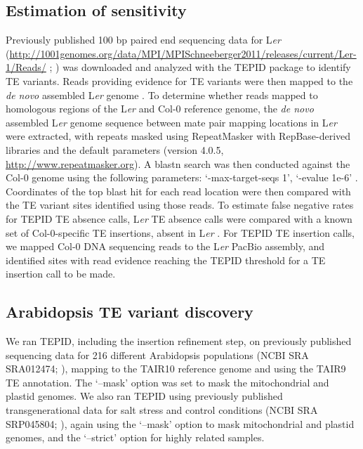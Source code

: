 \documentclass[12pt]{article}
\begin{document}
\subsection{Estimation of sensitivity}

Previously published 100 bp paired end sequencing data for L\emph{er}
(\url{http://1001genomes.org/data/MPI/MPISchneeberger2011/releases/current/Ler-1/Reads/}
; \cite{Schneeberger:2011ft}) was downloaded and analyzed with the TEPID
package to identify TE variants. Reads providing evidence for TE
variants were then mapped to the \emph{de novo} assembled L\emph{er}
genome \cite{Chin:2013iw}. To determine whether reads mapped to
homologous regions of the L\emph{er} and Col-0 reference genome, the
\emph{de novo }assembled L\emph{er }genome sequence between mate pair
mapping locations in L\emph{er} were extracted, with repeats masked
using RepeatMasker with RepBase-derived libraries and the default
parameters (version 4.0.5, \url{http://www.repeatmasker.org}). A blastn
search was then conducted against the Col-0 genome using the following
parameters: `-max-target-seqs 1', `-evalue 1e-6' \cite{Camacho:2009fc}.
Coordinates of the top blast hit for each read location were then
compared with the TE variant sites identified using those reads. To
estimate false negative rates for TEPID TE absence calls, L\emph{er} TE
absence calls were compared with a known set of Col-0-specific TE
insertions, absent in L\emph{er }\cite{Quadrana:2016bi}. For TEPID TE
insertion calls, we mapped Col-0 DNA sequencing reads
\cite{Jiang:2014ih} to the L\emph{er }PacBio assembly, and identified
sites with read evidence reaching the TEPID threshold for a TE insertion
call to be made.

\subsection{Arabidopsis TE variant discovery}

We ran TEPID, including the insertion refinement step, on previously
published sequencing data for 216 different Arabidopsis populations
(NCBI SRA SRA012474; \cite{Schmitz:2013iu}), mapping to the TAIR10
reference genome and using the TAIR9 TE annotation. The `--mask' option
was set to mask the mitochondrial and plastid genomes. We also ran
TEPID using previously published transgenerational data for salt stress
and control conditions (NCBI SRA SRP045804; \cite{Jiang:2014ih}), again using
the `--mask' option to mask mitochondrial and plastid genomes, and the
`--strict' option for highly related samples.
\end{document}
